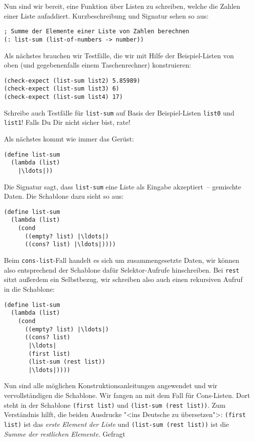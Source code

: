 Nun sind wir bereit, eine Funktion über Listen zu schreiben, welche
die Zahlen einer Liste aufaddiert.  Kurzbeschreibung und Signatur
sehen so aus:
%
\begin{lstlisting}
; Summe der Elemente einer Liste von Zahlen berechnen
(: list-sum (list-of-numbers -> number))
\end{lstlisting}
%
Als nächstes brauchen wir Testfälle, die wir mit Hilfe der
Beispiel-Listen von oben (und gegebenenfalls einem Taschenrechner)
konstruieren:
%
\begin{lstlisting}
(check-expect (list-sum list2) 5.85989)
(check-expect (list-sum list3) 6)
(check-expect (list-sum list4) 17)
\end{lstlisting}
%
\begin{aufgabe}
  Schreibe auch Testfälle für \lstinline{list-sum} auf Basis der
  Beispiel-Listen \lstinline{list0} und \lstinline{list1}!  Falls Du
  Dir nicht sicher bist, rate!
\end{aufgabe}
%
Als nächstes kommt wie immer das Gerüst:
%
\begin{lstlisting}
(define list-sum
  (lambda (list)
    |\ldots|))
\end{lstlisting}
%
Die Signatur sagt, dass \lstinline{list-sum} eine Liste als Eingabe
akzeptiert~-- gemischte Daten.  Die Schablone dazu sieht so aus:
%
\begin{lstlisting}
(define list-sum
  (lambda (list)
    (cond
      ((empty? list) |\ldots|)
      ((cons? list) |\ldots|))))
\end{lstlisting}       
%
Beim \lstinline{cons-list}-Fall handelt es sich um zusammengesetzte
Daten, wir können also entsprechend der Schablone dafür
Selektor-Aufrufe hinschreiben.  Bei \lstinline{rest} sitzt außerdem
ein Selbstbezug, wir schreiben also auch einen rekursiven Aufruf in
die Schablone:
%
\begin{lstlisting}
(define list-sum
  (lambda (list)
    (cond
      ((empty? list) |\ldots|)
      ((cons? list)
       |\ldots|
       (first list)
       (list-sum (rest list))
       |\ldots|))))
\end{lstlisting}
%
Nun sind alle möglichen Konstruktionsanleitungen angewendet und wir
vervollständigen die Schablone.  Wir fangen an mit dem Fall für
Cons-Listen.  Dort steht in der Schablone \lstinline{(first list)} 
und \lstinline{(list-sum (rest list))}.  Zum Verständnis
hilft, die beiden Ausdrucke "<ins Deutsche zu übersetzen">:
\lstinline{(first list)} ist das \emph{erste Element der Liste} und
\lstinline{(list-sum (rest list))} ist die \emph{Summe der restlichen
  Elemente}. Gefragt
